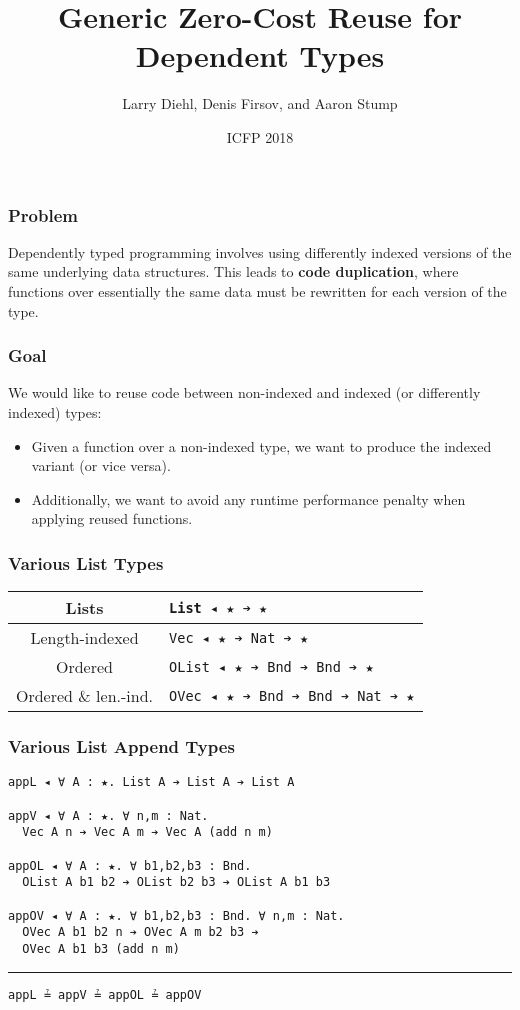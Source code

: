\documentclass[mathserif,usenames,dvipsnames]{beamer}
\title{Generic Zero-Cost Reuse for Dependent Types}
\author{Larry Diehl, Denis Firsov, and Aaron Stump}
\institute{University of Iowa}
\date[September 26, 2018]
{ICFP 2018}
\begin{document}
\frame{\titlepage}

\begin{frame}
\frametitle{Problem}

Dependently typed programming involves using differently indexed
versions of the same underlying data structures. This leads to
\textbf{code duplication}, where functions over essentially the same
data must be rewritten for each version of the type.

\end{frame}

\begin{frame}
\frametitle{Goal}

We would like to reuse code between non-indexed and indexed (or
differently indexed) types:

\begin{itemize}
\item Given a function over a non-indexed type,
  we want to produce the indexed variant (or vice versa).
\item Additionally, we want to avoid any runtime performance penalty
  when applying reused functions.
\end{itemize}

\end{frame}

\begin{frame}
\frametitle{Various List Types}

\begin{center}
\begin{tabular}{ |c||l| } 
 \hline
 Lists & \texttt{List ◂ ★ ➔ ★} \\
 \hline
 Length-indexed & \texttt{Vec ◂ ★ ➔ Nat ➔ ★} \\
 \hline
 Ordered & \texttt{OList ◂ ★ ➔ Bnd ➔ Bnd ➔ ★} \\ 
 \hline
 Ordered \& len.-ind. & \texttt{OVec ◂ ★ ➔ Bnd ➔ Bnd ➔ Nat ➔ ★} \\ 
 \hline
\end{tabular}
\end{center}

\end{frame}

\begin{frame}[fragile]
\frametitle{Various List Append Types}

\begin{verbatim}
appL ◂ ∀ A : ★. List A ➔ List A ➔ List A

appV ◂ ∀ A : ★. ∀ n,m : Nat. 
  Vec A n ➔ Vec A m ➔ Vec A (add n m)

appOL ◂ ∀ A : ★. ∀ b1,b2,b3 : Bnd. 
  OList A b1 b2 ➔ OList b2 b3 ➔ OList A b1 b3

appOV ◂ ∀ A : ★. ∀ b1,b2,b3 : Bnd. ∀ n,m : Nat.
  OVec A b1 b2 n ➔ OVec A m b2 b3 ➔ 
  OVec A b1 b3 (add n m)
\end{verbatim}

\noindent\rule{\textwidth}{1pt}

\begin{verbatim}
appL ≟ appV ≟ appOL ≟ appOV
\end{verbatim}

\end{frame}
\end{document}
